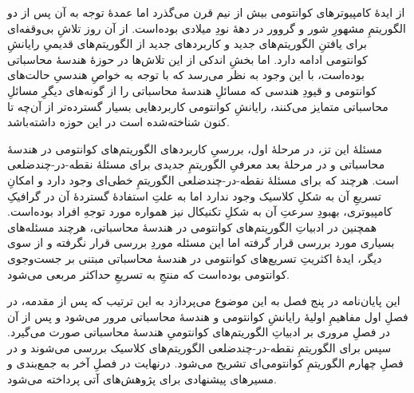 


از ایدهٔ کامپیوترهای کوانتومی بیش از نیم قرن می‌گذرد اما عمدهٔ توجه به آن پس از دو الگوریتمِ مشهورِ شور و گروور در دههٔ نودِ میلادی بوده‌است. از آن روز تلاشِ بی‌وقفه‌ای برای یافتنِ الگوریتم‌های جدید و کاربردهای جدید از الگوریتم‌های قدیمیِ رایانشِ کوانتومی ادامه دارد. اما بخشِ اندکی از این تلاش‌ها در حوزهٔ هندسهٔ محاسباتی بوده‌است، با این وجود به نظر می‌رسد که با توجه به خواصِ هندسیِ حالت‌های کوانتومی و قیودِ هندسی که مسائلِ هندسهٔ محاسباتی را از گونه‌های دیگرِ مسائلِ محاسباتی متمایز می‌کنند، رایانشِ کوانتومی کاربردهایی بسیار گسترده‌تر از آن‌چه تا کنون شناخته‌شده است در این حوزه داشته‌باشد.

مسئلهٔ این تز، در مرحلهٔ اول، بررسیِ کاربردهای الگوریتم‌های کوانتومی در هندسهٔ محاسباتی و در مرحلهٔ بعد  معرفیِ الگوریتمِ جدیدی برای مسئلهٔ نقطه-در-چندضلعی است.
هرچند که برای مسئلهٔ نقطه‌-در-چندضلعی الگوریتمِ خطی‌ای وجود دارد و امکانِ تسریعِ آن به شکلِ کلاسیک وجود ندارد اما به علتِ استفاده‌ٔ گستردهٔ آن در گرافیکِ کامپیوتری، بهبودِ سرعتِ آن به شکلِ تکنیکال نیز همواره مورد توجهِ افراد بوده‌است.
همچنین در ادبیاتِ الگوریتم‌های کوانتومی در هندسهٔ محاسباتی، هرچند مسئله‌های بسیاری مورد بررسی قرار گرفته اما این مسئله موردِ بررسی قرار نگرفته و از سوی دیگر، ایدهٔ اکثریتِ تسریع‌های کوانتومی در هندسهٔ محاسباتی مبتنی بر جست‌وجوی کوانتومی بوده‌است که منتجِ به تسریعِ حداکثر مربعی می‌شود.


این پایان‌نامه در پنج فصل به این موضوع می‌پردازد به این ترتیب که پس از مقدمه، در فصلِ اول مفاهیمِ اولیهٔ رایانشِ کوانتومی و هندسهٔ محاسباتی مرور می‌شود و پس از آن در فصلِ مروری بر ادبیاتِ الگوریتم‌های کوانتومیِ هندسهٔ محاسباتی صورت می‌گیرد. سپس برای الگوریتمِ نقطه-در-چندضلعی الگوریتم‌های کلاسیک بررسی می‌شوند و در فصلِ چهارم الگوریتمِ کوانتومی‌ای تشریح می‌شود. درنهایت در فصلِ آخر به جمع‌بندی و مسیرهای پیشنهادی برای پژوهش‌های آتی پرداخته می‌شود.
